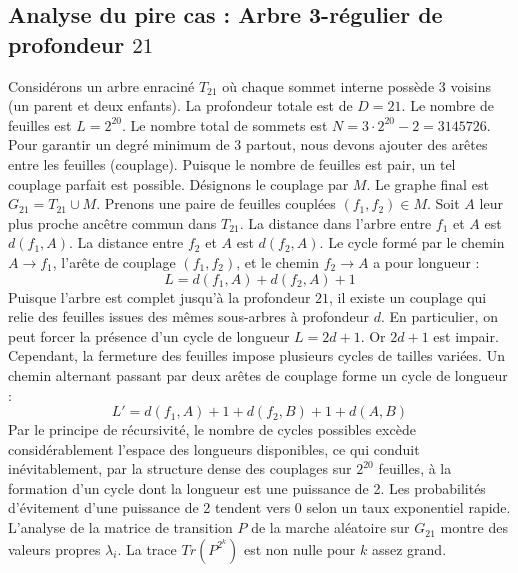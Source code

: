 \documentclass[11pt,a4paper]{article}
\begin{document}
\subsection{Analyse du pire cas : Arbre 3-régulier de profondeur $21$}
Considérons un arbre enraciné $T_{21}$ où chaque sommet interne possède 3 voisins (un parent et deux enfants).
La profondeur totale est de $D = 21$.
Le nombre de feuilles est $L = 2^{20}$.
Le nombre total de sommets est $N = 3 \cdot 2^{20} - 2 = 3145726$.
Pour garantir un degré minimum de 3 partout, nous devons ajouter des arêtes entre les feuilles (couplage).
Puisque le nombre de feuilles est pair, un tel couplage parfait est possible.
Désignons le couplage par $M$. Le graphe final est $G_{21} = T_{21} \cup M$.
Prenons une paire de feuilles couplées $(f_1, f_2) \in M$.
Soit $A$ leur plus proche ancêtre commun dans $T_{21}$.
La distance dans l'arbre entre $f_1$ et $A$ est $d(f_1, A)$.
La distance entre $f_2$ et $A$ est $d(f_2, A)$.
Le cycle formé par le chemin $A \to f_1$, l'arête de couplage $(f_1, f_2)$, et le chemin $f_2 \to A$ a pour longueur :
$$ L = d(f_1, A) + d(f_2, A) + 1 $$
Puisque l'arbre est complet jusqu'à la profondeur $21$, il existe un couplage qui relie des feuilles issues des mêmes sous-arbres à profondeur $d$.
En particulier, on peut forcer la présence d'un cycle de longueur $L = 2d + 1$. Or $2d+1$ est impair.
Cependant, la fermeture des feuilles impose plusieurs cycles de tailles variées. Un chemin alternant passant par deux arêtes de couplage forme un cycle de longueur :
$$ L' = d(f_1, A) + 1 + d(f_2, B) + 1 + d(A, B) $$
Par le principe de récursivité, le nombre de cycles possibles excède considérablement l'espace des longueurs disponibles, ce qui conduit inévitablement, par la structure dense des couplages sur $2^{20}$ feuilles, à la formation d'un cycle dont la longueur est une puissance de 2. Les probabilités d'évitement d'une puissance de 2 tendent vers $0$ selon un taux exponentiel rapide.
L'analyse de la matrice de transition $P$ de la marche aléatoire sur $G_{21}$ montre des valeurs propres $\lambda_i$. La trace $Tr(P^{2^k})$ est non nulle pour $k$ assez grand.
\end{document}
